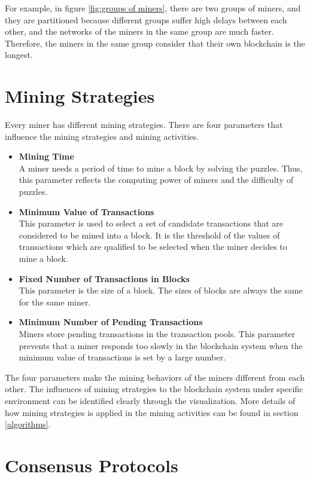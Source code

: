 For example, in figure \ref{fig:groups of miners}, there are two groups of miners, and they are partitioned because different groups suffer high delays between each other, and the networks of the miners in the same group are much faster. Therefore, the miners in the same group consider that their own blockchain is the longest.

\section{Mining Strategies}

Every miner has different mining strategies. There are four parameters that influence the mining strategies and mining activities. 

\begin{itemize}
    \item \textbf{Mining Time} \\
        A miner needs a period of time to mine a block by solving the puzzles. Thus, this parameter reflects the computing power of miners and the difficulty of puzzles.
    \item \textbf{Minimum Value of Transactions} \\
        This parameter is used to select a set of candidate transactions that are considered to be mined into a block. It is the threshold of the values of transactions which are qualified to be selected when the miner decides to mine a block.
    \item \textbf{Fixed Number of Transactions in Blocks} \\
        This parameter is the size of a block. The sizes of blocks are always the same for the same miner.
    \item \textbf{Minimum Number of Pending Transactions} \\
        Miners store pending transactions in the transaction pools. This parameter prevents that a miner responds too slowly in the blockchain system when the minimum value of transactions is set by a large number.
\end{itemize}

The four parameters make the mining behaviors of the miners different from each other. The influences of mining strategies to the blockchain system under specific environment can be identified clearly through the visualization. More details of how mining strategies is applied in the mining activities can be found in section \ref{algorithms}.

\section{Consensus Protocols}

